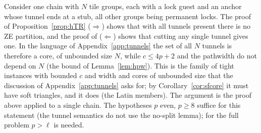 \begin{remark}\label{rem:hchaincore}
Consider one chain with $N$ tile groups, each with a lock guest and an anchor whose tunnel ends at a stub, all other groups being permanent locks. The proof of Proposition~\ref{prop:hTR} ($\Rightarrow$) shows that with all tunnels present there is no ZE partition, and the proof of ($\Leftarrow$) shows that cutting any single tunnel gives one. In the language of Appendix~\ref{app:tunnels} the set of all $N$ tunnels is therefore a core, of unbounded size $N$, while $c\le4p+2$ and the pathwidth do not depend on $N$ (the bound of Lemma~\ref{lem:hpw}). This is the family of tight instances with bounded $c$ and width and cores of unbounded size that the discussion of Appendix~\ref{app:tunnels} asks for; by Corollary~\ref{cor:sfcore} it must have soft triangles, and it does (the Latin members). The argument is the proof above applied to a single chain. The hypotheses $p$ even, $p\ge8$ suffice for this statement (the tunnel semantics do not use the no-split lemma); for the full problem $p>\ell$ is needed.
\end{remark}

